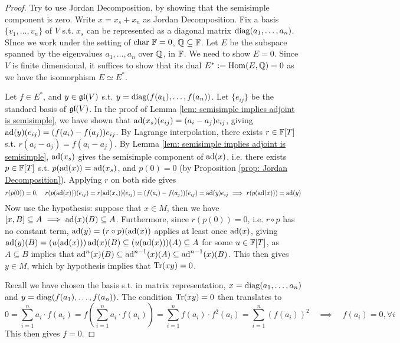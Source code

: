 \documentclass{article}
\begin{document}
\begin{proof}
    Try to use Jordan Decomposition, by showing that the semisimple component is zero. Write $x = x_s + x_n$ as Jordan Decomposition. Fix a basis $\{ v_1, \dots, v_n \}$ of $V$ s.t. $x_s$ can be represented as a diagonal matrix $\operatorname{diag}( a_1, \dots, a_n )$. SInce we work under the setting of $\mathrm{char}\ {\mathbb{F}} = 0$, $\mathbb{Q} \subseteq \mathbb{F}$. Let $E$ be the subspace spanned by the eigenvalues $a_1, \dots, a_n$ over $\mathbb{Q}$, in $\mathbb{F}$. We need to show $E = 0$. Since $V$ is finite dimensional, it suffices to show that its dual $E^* := \mathrm{Hom}(E, \mathbb{Q}) = 0$ as we have the isomorphism $E \simeq E^*$.

    Let $f \in E^*$, and $y \in \mathfrak{gl}(V)$ s.t. $y = \operatorname{diag}(f(a_1), \dots, f(a_n))$. Let $\{ e_{ij} \}$ be the standard basis of $\mathfrak{gl}(V)$. In the proof of Lemma \ref{lem: semisimple implies adjoint is semisimple}, we have shown that $\operatorname{ad}(x_s)(e_{ij}) = (a_i - a_j) e_{ij}$, giving $\operatorname{ad}(y)(e_{ij}) = (f(a_i) - f(a_j))e_{ij}$. By Lagrange interpolation, there exists $r \in \mathbb{F}[T]$ s.t. $r(a_i - a_j) = f(a_i - a_j)$. By Lemma \ref{lem: semisimple implies adjoint is semisimple}, $\operatorname{ad}(x_s)$ gives the semisimple component of $\operatorname{ad}(x)$, i.e. there exists $p \in \mathbb{F}[T]$ s.t. $p(\operatorname{ad}(x)) = \operatorname{ad}(x_s)$, and $p(0) = 0$ (by Proposition \ref{prop: Jordan Decomposition}). Applying $r$ on both side gives
    \[
        r(p(0)) = 0, \quad r(p(\operatorname{ad}(x)))(e_{ij}) = r(\operatorname{ad}(x_s))(e_{ij}) = (f(a_i) - f(a_j))(e_{ij}) = \operatorname{ad}(y)e_{ij} \ \Longrightarrow\  r(p(\operatorname{ad}(x))) = \operatorname{ad}(y)
    \]
    Now use the hypothesis: suppose that $x \in M$, then we have $[x, B] \subseteq A \ \Longrightarrow\  \operatorname{ad}(x)(B) \subseteq A$. Furthermore, since $r(p(0)) = 0$, i.e. $r \circ p$ has no constant term, $\operatorname{ad}(y) = (r \circ p)(\operatorname{ad}(x))$ applies at least once $\operatorname{ad}(x)$, giving $\operatorname{ad}(y)(B) = (u(\operatorname{ad}(x)))\operatorname{ad}(x)(B) \subseteq (u(\operatorname{ad}(x)))(A) \subseteq A$ for some $u \in \mathbb{F}[T]$, as $A \subseteq B$ implies that $\operatorname{ad}^n(x)(B) \subseteq \operatorname{ad}^{n-1}(x)(A) \subseteq \operatorname{ad}^{n-1}(x)(B)$. This then gives $y \in M$, which by hypothesis implies that $\operatorname{Tr}(xy) = 0$.

    Recall we have chosen the basis s.t. in matrix representation, $x = \operatorname{diag}(a_1, \dots, a_n)$ and $y = \operatorname{diag}(f(a_1), \dots, f(a_n))$. The condition $\operatorname{Tr}(xy) = 0$ then translates to 
    \[
        0 = \sum_{i = 1}^n a_i \cdot f(a_i) = f\left( \sum_{i = 1}^n a_i \cdot f(a_i) \right) = \sum_{i = 1}^n f(a_i) \cdot f^2(a_i) = \sum_{i = 1}^n (f(a_i))^2 \quad \implies \quad f(a_i) = 0, \forall i
    \]
    This then gives $f = 0$.
\end{proof}
\end{document}
